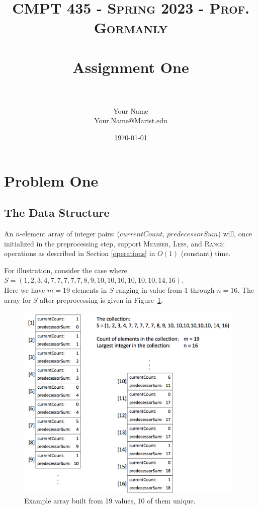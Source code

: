 \documentclass[10pt]{article}
\title{	
   \normalfont \normalsize 
   \textsc{CMPT 435 - Spring 2023 - Prof. Gormanly} \\[10pt] %
   \horrule{0.5pt} \\[0.25cm] 	%
   \huge Assignment One  \\     	    %
   \horrule{0.5pt} \\[0.25cm] 	%
}
\author{Your Name \\ \normalsize Your.Name@Marist.edu}
\date{\normalsize\today} 	%
\begin{document}
\maketitle %

\section{Problem One}

\subsection{The Data Structure}
An $n$-element array of integer pairs: ($currentCount$, $predecessorSum$) will, once initialized in the preprocessing step,  support \textsc{Member}, \textsc{Less}, and \textsc{Range} operations as described in Section \ref{operations} in $O(1)$ (constant) time.

For illustration, consider the case where $S = (1, 2, 3, 4, 7, 7, 7, 7, 7, 8, 9, 10, 10,10,10,10,10, 14, 16)$. \\
Here we have $m = 19$ elements in $S$ ranging in value from 1 through $n = 16$.
The array for $S$ after preprocessing is given in Figure~\ref{figure:array}.

\begin{figure}[ht] 
   \centering 
   \includegraphics[width=11cm]{array}
   \caption{Example array built from 19 values, 10 of them unique.}
   \label{figure:array}
\end{figure}
\end{document}
